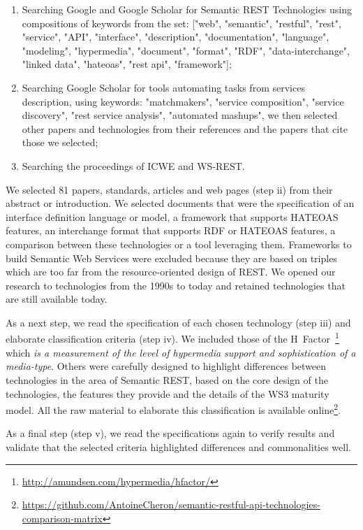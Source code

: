 \begin{enumerate}
    \item Searching Google and Google Scholar for Semantic REST Technologies using compositions of keywords from the set: ["web", "semantic", "restful", "rest", "service", "API", "interface", "description", "documentation", "language", "modeling", "hypermedia", "document", "format", "RDF", "data-interchange", "linked data", "hateoas", "rest api", "framework"];
    \item Searching Google Scholar for tools automating tasks from services description, using keywords: "matchmakers", "service composition", "service discovery", "rest service analysis", "automated mashups", we then selected other papers and technologies from their references and the papers that cite those we selected;
    \item Searching the proceedings of ICWE and WS-REST. 
\end{enumerate}

We selected 81 papers, standards, articles and web pages (step ii) from their abstract or introduction. We selected documents that were the specification of an interface definition language or model, a framework that supports HATEOAS features, an interchange format that supports RDF or HATEOAS features, a comparison between these technologies or a tool leveraging them. Frameworks to build Semantic Web Services were excluded because they are based on triples which are too far from the resource-oriented design of REST. We opened our research to technologies from the 1990s to today and retained technologies that are still available today.

As a next step, we read the specification of each chosen technology (step iii) and elaborate classification criteria (step iv). We included those of the H~Factor~\footnote{\url{http://amundsen.com/hypermedia/hfactor/}} which \textit{is a measurement of the level of hypermedia support and sophistication of a media-type}. Others were carefully designed to highlight differences between technologies in the area of Semantic REST, based on the core design of the technologies, the features they provide and the details of the WS3 maturity model. All the raw material to elaborate this classification is available online\footnote{\url{https://github.com/AntoineCheron/semantic-restful-api-technologies-comparison-matrix}}.

As a final step (step v), we read the specifications again to verify results and validate that the selected criteria highlighted differences and commonalities well.

